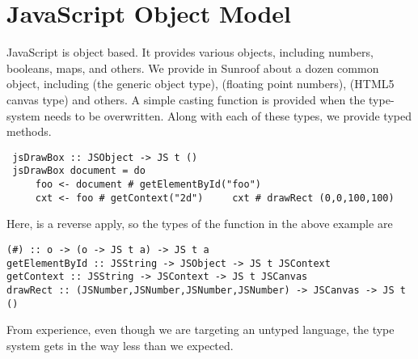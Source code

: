  
\section{JavaScript Object Model}
\label{sec:object-model}

JavaScript is object based. It provides various objects,
including numbers, booleans, maps, and others. We
provide in Sunroof about a dozen common object,
including  (the generic object type), 
(floating point numbers),  (HTML5 canvas type) 
and others. A simple
casting function is provided when the type-system
needs to be overwritten. Along with each of these types,
we provide typed methods.
\begin{verbatim}
 jsDrawBox :: JSObject -> JS t ()
 jsDrawBox document = do
     foo <- document # getElementById("foo")
     cxt <- foo # getContext("2d")     cxt # drawRect (0,0,100,100)
\end{verbatim}
Here, \Src{\#} is a reverse apply, so the types
of the function in the above example are
\begin{verbatim}
(#) :: o -> (o -> JS t a) -> JS t a
getElementById :: JSString -> JSObject -> JS t JSContext
getContext :: JSString -> JSContext -> JS t JSCanvas
drawRect :: (JSNumber,JSNumber,JSNumber,JSNumber) -> JSCanvas -> JS t ()
\end{verbatim}        
From experience, even though we are targeting
an untyped language, the type system gets in the
way less than we expected.


